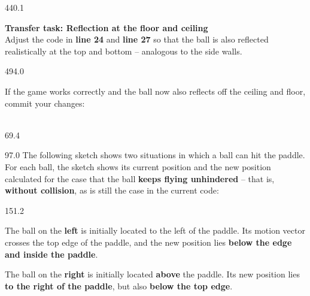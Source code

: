 \documentclass{aslab}
\begin{document}
\begin{region}[pitch=13.8]{440.1}
\begin{ntasks}[start=2]
\item \textbf{Transfer task: Reflection at the floor and ceiling}\\
  Adjust the code in \textbf{line 24} and \textbf{line 27} so that the ball is
  also reflected realistically at the top and bottom -- analogous to the side
  walls.
\end{ntasks}
\end{region}

\begin{region}[pitch=13.37]{494.0}
\begin{ntasks}[start=3]
\item If the game works correctly and the ball now also reflects off the
  ceiling and floor, commit your changes:\\
  \\
\end{ntasks}
\end{region}

\nextpage
\begin{region}{69.4}
\end{region}

\begin{region}[pitch=13.67]{97.0}
The following sketch shows two situations in which a ball can hit the
paddle.\\
For each ball, the sketch shows its current position 
and the new position  calculated for the case that the ball \textbf{keeps flying
unhindered} -- that is, \textbf{without collision}, as is still the case in
the current code:
\end{region}

\begin{region}[pitch=14.5]{151.2}
\begin{dashlist}
\item The ball on the \textbf{left} is initially located to the left of the
  paddle. Its motion vector crosses the top edge of the paddle, and the new
  position lies \textbf{below the edge and inside the paddle}.
\item The ball on the \textbf{right} is initially located \textbf{above} the
  paddle. Its new position lies \textbf{to the right of the paddle}, but also
  \textbf{below the top edge}.
\end{dashlist}
\end{region}
\end{document}

